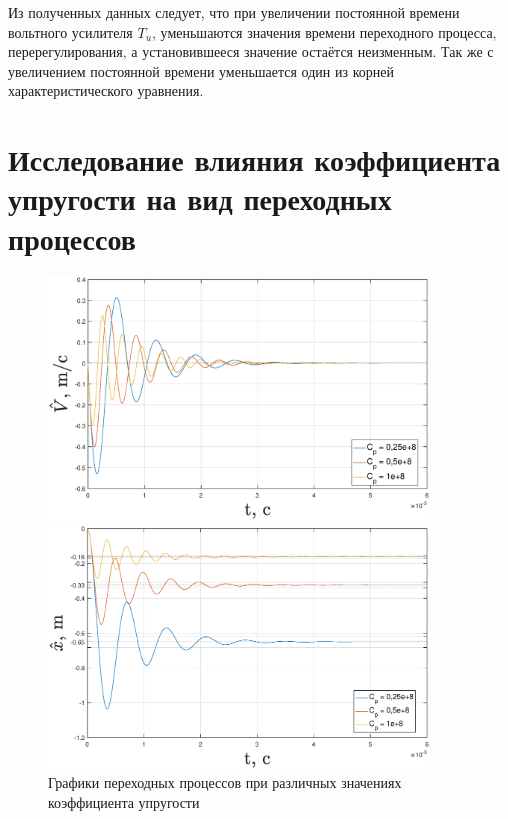 \documentclass[fleqn, a4paper, 11pt, russian]{article}
\begin{document}
	Из полученных данных следует, что при увеличении постоянной времени вольтного усилителя $T_u$, уменьшаются значения времени переходного процесса, перерегулирования, а установившееся значение остаётся неизменным. Так же с увеличением постоянной времени уменьшается один из корней характеристического уравнения.
	\clearpage
	{\centering
		\section{Исследование влияния коэффициента упругости на вид переходных процессов}
	}
	\begin{figure}[ht!]
		\includegraphics[width = 0.9\textwidth]{Cvar/CvarV}
		
		\includegraphics[width = 0.9\textwidth]{Cvar/CvarX}
		\caption{Графики переходных процессов при различных значениях коэффициента упругости}
		\label{CvarGraph}
	\end{figure}
	
\end{document}
